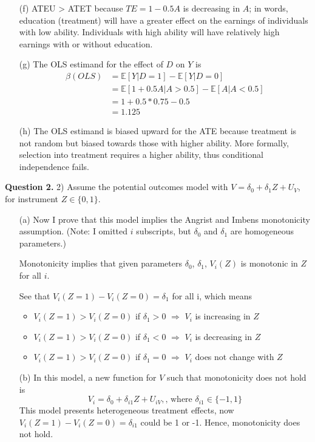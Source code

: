 \documentclass{article}
\theoremstyle{definition}
\begin{document}
\begin{itemize}
    \item[(f)] ATEU > ATET because $TE = 1-0.5A$ is decreasing in $A$; in words, education (treatment) will have a greater effect on the earnings of individuals with low ability. Individuals with high ability will have relatively high earnings with or without education. 
    
    \item[(g)] The OLS estimand for the effect of $D$ on $Y$ is
    \begin{align*}
        \beta(OLS) &= \mathbb{E}[Y|D=1] - \mathbb{E}[Y|D=0]\\
                   &= \mathbb{E}[1+0.5A|A>0.5] - \mathbb{E}[A|A<0.5]\\
                   &= 1 + 0.5*0.75  - 0.5\\
                   &= 1.125
    \end{align*}
    
    \item[(h)] The OLS estimand is biased upward for the ATE because treatment is not random but biased towards those with higher ability. More formally, selection into treatment requires a higher ability, thus conditional independence fails.

   \end{itemize}
   
    \noindent \hspace{0.41cm} \textbf{Question 2.}  2) Assume the potential outcomes model with $V=\delta_{0}+\delta_{1} Z+U_{V}$, for instrument $Z \in\{0,1\}$.
    \begin{itemize}
        \item[(a)] Now I prove that this model implies the Angrist and Imbens monotonicity assumption. (Note:  I omitted $i$ subscripts, but $\delta_{0}$ and $\delta_{1}$ are homogeneous parameters.)
        
        Monotonicity implies that given parameters $\delta_0$, $\delta_1$, $V_i(Z)$ is monotonic in $Z$ for all $i$.
        
        See that $V_i(Z=1)-V_i(Z=0) = \delta_1$ for all i, which means
        \begin{itemize}
            \item $V_i(Z=1)>V_i(Z=0)$ if $\delta_1>0$ $\Rightarrow$ $V_i$ is increasing in $Z$
            \item $V_i(Z=1)>V_i(Z=0)$ if $\delta_1<0$ $\Rightarrow$ $V_i$ is decreasing in $Z$
            \item $V_i(Z=1)>V_i(Z=0)$ if $\delta_1=0$ $\Rightarrow$ $V_i$ does not change with $Z$
        \end{itemize}
        
        \item[(b)] In this model, a new function for $V$ such that monotonicity does not hold is
        $$ V_i = \delta_{0}+\delta_{i1} Z +U_{iV}, \text{, where } \delta_{i1} \in \{-1,1\}$$
        This model presents heterogeneous treatment effects, now $V_i(Z=1)-V_i(Z=0) = \delta_{i1}$ could be 1 or -1. Hence, monotonicity does not hold. 
    \end{itemize}
    
\end{document}
